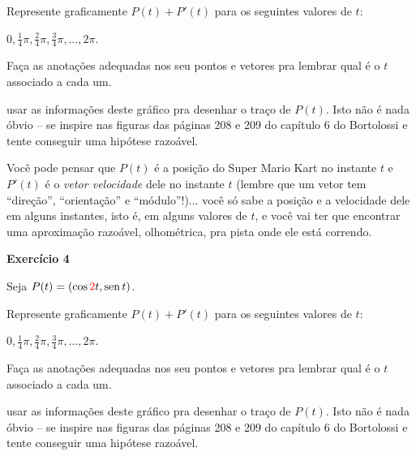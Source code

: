 \documentclass[oneside,12pt]{article}
\begin{document}
Represente graficamente $P(t)+P'(t)$ para os seguintes valores de $t$:

$0, \frac14π, \frac24π, \frac34π, \ldots, 2π$.

Faça as anotações adequadas nos seu pontos e vetores pra lembrar qual
é o $t$ associado a cada um.

\msk

 usar as informações deste gráfico pra desenhar o
traço de $P(t)$. Isto não é nada óbvio -- se inspire nas figuras das
páginas 208 e 209 do capítulo 6 do Bortolossi e tente conseguir uma
hipótese razoável.

\msk

Você pode pensar que $P(t)$ é a posição do Super Mario Kart no
instante $t$ e $P'(t)$ é o {\sl vetor velocidade} dele no instante $t$
(lembre que um vetor tem ``direção'', ``orientação'' e ``módulo''!)...
você só sabe a posição e a velocidade dele em alguns instantes, isto
é, em alguns valores de $t$, e você vai ter que encontrar uma
aproximação razoável, olhométrica, pra pista onde ele está correndo.



\newpage


{\bf Exercício 4}

Seja $P(t) = (\cos \ColorRed{2}t, \sen t)$.

Represente graficamente $P(t)+P'(t)$ para os seguintes valores de $t$:

$0, \frac14π, \frac24π, \frac34π, \ldots, 2π$.

Faça as anotações adequadas nos seu pontos e vetores pra lembrar qual
é o $t$ associado a cada um.

\msk

 usar as informações deste gráfico pra desenhar o
traço de $P(t)$. Isto não é nada óbvio -- se inspire nas figuras das
páginas 208 e 209 do capítulo 6 do Bortolossi e tente conseguir uma
hipótese razoável.


\msk









\end{document}

